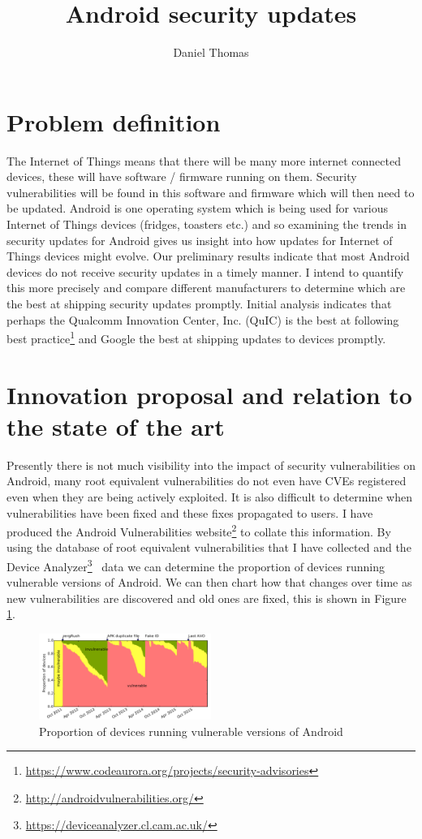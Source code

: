 \documentclass[a4paper,twocolumn]{article}
\author{Daniel Thomas}
\title{Android security updates}
\date{}%
\begin{document}
\maketitle

\section*{Problem definition}
The Internet of Things means that there will be many more internet connected devices, these will have software / firmware running on them.
Security vulnerabilities will be found in this software and firmware which will then need to be updated.
Android is one operating system which is being used for various Internet of Things devices (fridges, toasters etc.) and so examining the trends in security updates for Android gives us insight into how updates for Internet of Things devices might evolve.
Our preliminary results indicate that most Android devices do not receive security updates in a timely manner.
I intend to quantify this more precisely and compare different manufacturers to determine which are the best at shipping security updates promptly.
Initial analysis indicates that perhaps the Qualcomm Innovation Center, Inc. (QuIC) is the best at following best practice\footnote{\url{https://www.codeaurora.org/projects/security-advisories}} and Google the best at shipping updates to devices promptly.


\section*{Innovation proposal and relation to the state of the art}
Presently there is not much visibility into the impact of security vulnerabilities on Android, many root equivalent vulnerabilities do not even have CVEs registered even when they are being actively exploited.
It is also difficult to determine when vulnerabilities have been fixed and these fixes propagated to users.
I have produced the Android Vulnerabilities website\footnote{\url{http://androidvulnerabilities.org/}} to collate this information.
By using the database of root equivalent vulnerabilities that I have collected and the Device Analyzer\footnote{\url{https://deviceanalyzer.cl.cam.ac.uk/}}~\cite{TODO} data we can determine the proportion of devices running vulnerable versions of Android.
We can then chart how that changes over time as new vulnerabilities are discovered and old ones are fixed, this is shown in Figure \ref{fig:propinsecure}.

\begin{figure}
 \includegraphics[width=0.5\textwidth]{figures/proportioninsecure.pdf}
 \caption{Proportion of devices running vulnerable versions of Android}
 \label{fig:propinsecure}
\end{figure}
\end{document}
